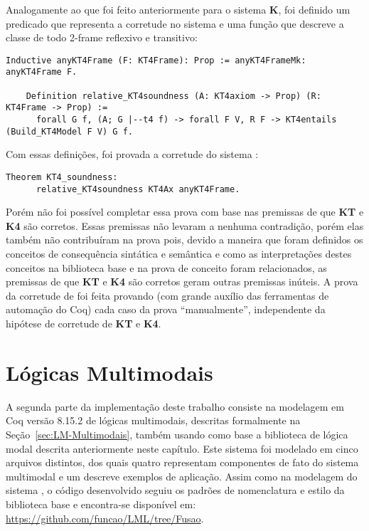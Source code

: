       Analogamente ao que foi feito anteriormente para o sistema \textbf{K}, foi definido um predicado que representa a corretude no sistema \SisT e uma função que descreve a
      classe de todo 2-frame reflexivo e transitivo:
      \begin{lstlisting}[language=coq]
    Inductive anyKT4Frame (F: KT4Frame): Prop := anyKT4FrameMk: anyKT4Frame F.

    Definition relative_KT4soundness (A: KT4axiom -> Prop) (R: KT4Frame -> Prop) :=
      forall G f, (A; G |--t4 f) -> forall F V, R F -> KT4entails (Build_KT4Model F V) G f.
      \end{lstlisting}

      Com essas definições, foi provada a corretude do sistema \SisT:
    \begin{lstlisting}[language=coq]
    Theorem KT4_soundness:
      relative_KT4soundness KT4Ax anyKT4Frame.
    \end{lstlisting}

      Porém não foi possível completar essa prova com base nas premissas de que \textbf{KT} e \textbf{K4} são corretos. Essas premissas não levaram a nenhuma
      contradição, porém elas também não contribuíram na prova pois, devido a maneira que foram definidos os conceitos de consequência sintática e semântica e
      como as interpretações destes conceitos na biblioteca base e na prova de conceito foram relacionados, as premissas de que \textbf{KT} e \textbf{K4} são corretos geram
      outras premissas inúteis. A prova da corretude de \SisT foi feita provando (com grande auxílio das ferramentas de automação do Coq)
      cada caso da prova ``manualmente'', independente da hipótese de corretude de \textbf{KT} e \textbf{K4}.

    \section{Lógicas Multimodais}
      \label{sec:MultimodaisCoq}
      A segunda parte da implementação deste trabalho consiste na modelagem em Coq versão 8.15.2 de lógicas multimodais, descritas formalmente na Seção~\ref{sec:LM-Multimodais}, também usando
      como base a biblioteca de lógica modal descrita anteriormente neste capítulo.
      Este sistema foi modelado em cinco arquivos distintos, dos quais quatro representam componentes de fato do sistema multimodal e um descreve exemplos de aplicação.
      Assim como na modelagem do sistema \SisT, o código desenvolvido seguiu os padrões de nomenclatura e estilo da biblioteca base e encontra-se disponível em:
      \url{https://github.com/funcao/LML/tree/Fusao}.

